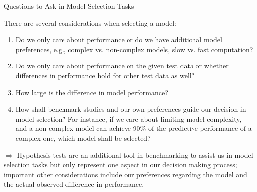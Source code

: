 \documentclass[11pt,compress,t,notes=noshow, aspectratio=169, xcolor=table]{beamer}
\begin{document}
\begin{frame}{Questions to Ask in Model Selection Tasks}

There are several considerations when selecting a model:
\vspace{0.25cm}
\begin{enumerate}
    \setlength\itemsep{1em}
    \item Do we only care about performance or do we have additional model preferences, e.g., complex vs. non-complex models, slow vs. fast computation?
    \item Do we only care about performance on the given test data or whether differences in performance hold for other test data as well?
    \item How large is the difference in model performance?
    \item How shall benchmark studies and our own preferences guide our decision in model selection? For instance, if we care about limiting model complexity, and a non-complex model can achieve 90\% of the predictive performance of a complex one, which model shall be selected?
\end{enumerate}
\vspace{0.5cm}
$\Rightarrow$ Hypothesis tests are an additional tool in benchmarking to assist us in model selection tasks but only represent one aspect in our decision making process; important other considerations include our preferences regarding the model and the actual observed difference in performance.



\end{frame}
\end{document}

